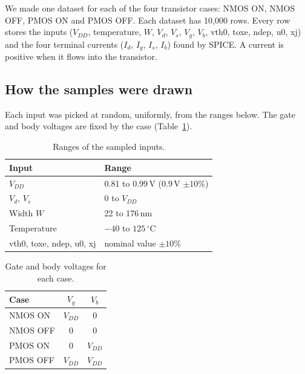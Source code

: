 \documentclass{article}
\begin{document}
We made one dataset for each of the four transistor cases: NMOS ON, NMOS OFF,
PMOS ON and PMOS OFF. Each dataset has 10{,}000 rows. Every row stores the
inputs ($V_{DD}$, temperature, $W$, $V_d$, $V_s$, $V_g$, $V_b$, vth0, toxe,
ndep, u0, xj) and the four terminal currents ($I_d$, $I_g$, $I_s$, $I_b$)
found by SPICE. A current is positive when it flows into the transistor.

\subsection{How the samples were drawn}

Each input was picked at random, uniformly, from the ranges below. The
gate and body voltages are fixed by the case (Table~\ref{tab:vgvb}).

\begin{table}[htbp]
\centering
\begin{tabular}{|l|l|}
\hline
Input & Range \\
\hline
$V_{DD}$ & 0.81 to 0.99\,V ($0.9$\,V $\pm 10\%$) \\
$V_d$, $V_s$ & 0 to $V_{DD}$ \\
Width $W$ & 22 to 176\,nm \\
Temperature & $-40$ to $125\,^\circ$C \\
vth0, toxe, ndep, u0, xj & nominal value $\pm 10\%$ \\
\hline
\end{tabular}
\caption{Ranges of the sampled inputs.}
\end{table}

\begin{table}[htbp]
\centering
\begin{tabular}{|l|c|c|}
\hline
Case & $V_g$ & $V_b$ \\
\hline
NMOS ON  & $V_{DD}$ & 0 \\
NMOS OFF & 0 & 0 \\
PMOS ON  & 0 & $V_{DD}$ \\
PMOS OFF & $V_{DD}$ & $V_{DD}$ \\
\hline
\end{tabular}
\caption{Gate and body voltages for each case.}
\label{tab:vgvb}
\end{table}
\end{document}
